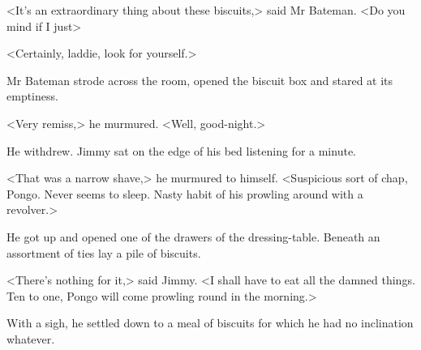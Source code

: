 <It's an extraordinary thing about these biscuits,> said Mr Bateman. <Do you mind if I just\longdash>

<Certainly, laddie, look for yourself.>

Mr Bateman strode across the room, opened the biscuit box and stared at its emptiness.

<Very remiss,> he murmured. <Well, good-night.>

He withdrew. Jimmy sat on the edge of his bed listening for a minute.

<That was a narrow shave,> he murmured to himself. <Suspicious sort of chap, Pongo. Never seems to sleep. Nasty habit of his prowling around with a revolver.>

He got up and opened one of the drawers of the dressing-table. Beneath an assortment of ties lay a pile of biscuits.

<There's nothing for it,> said Jimmy. <I shall have to eat all the damned things. Ten to one, Pongo will come prowling round in the morning.>

With a sigh, he settled down to a meal of biscuits for which he had no inclination whatever.